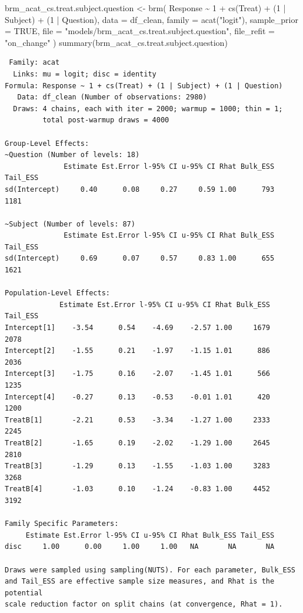 \documentclass[
  12pt,
  a4paper,
  extrafontsizes,
  onecolumn,
  openright]{memoir}
\newenvironment{Shaded}{\begin{snugshade}}{\end{snugshade}}
\newcommand{\AttributeTok}[1]{\textcolor[rgb]{0.40,0.45,0.13}{#1}}
\newcommand{\ConstantTok}[1]{\textcolor[rgb]{0.56,0.35,0.01}{#1}}
\newcommand{\DecValTok}[1]{\textcolor[rgb]{0.68,0.00,0.00}{#1}}
\newcommand{\FunctionTok}[1]{\textcolor[rgb]{0.28,0.35,0.67}{#1}}
\newcommand{\NormalTok}[1]{\textcolor[rgb]{0.00,0.23,0.31}{#1}}
\newcommand{\OtherTok}[1]{\textcolor[rgb]{0.00,0.23,0.31}{#1}}
\newcommand{\SpecialCharTok}[1]{\textcolor[rgb]{0.37,0.37,0.37}{#1}}
\newcommand{\StringTok}[1]{\textcolor[rgb]{0.13,0.47,0.30}{#1}}
\begin{document}
\begin{Shaded}
\begin{Highlighting}[]
\NormalTok{brm\_acat\_cs.treat.subject.question }\OtherTok{\textless{}{-}} \FunctionTok{brm}\NormalTok{(}
\NormalTok{    Response }\SpecialCharTok{\textasciitilde{}} \DecValTok{1} \SpecialCharTok{+} \FunctionTok{cs}\NormalTok{(Treat) }\SpecialCharTok{+}\NormalTok{ (}\DecValTok{1} \SpecialCharTok{|}\NormalTok{ Subject) }\SpecialCharTok{+}\NormalTok{ (}\DecValTok{1} \SpecialCharTok{|}\NormalTok{ Question),}
    \AttributeTok{data =}\NormalTok{ df\_clean,}
    \AttributeTok{family =} \FunctionTok{acat}\NormalTok{(}\StringTok{"logit"}\NormalTok{),}
    \AttributeTok{sample\_prior =} \ConstantTok{TRUE}\NormalTok{,}
    \AttributeTok{file =} \StringTok{"models/brm\_acat\_cs.treat.subject.question"}\NormalTok{,}
    \AttributeTok{file\_refit =} \StringTok{"on\_change"}
\NormalTok{)}
\FunctionTok{summary}\NormalTok{(brm\_acat\_cs.treat.subject.question)}
\end{Highlighting}
\end{Shaded}

\begin{verbatim}
 Family: acat 
  Links: mu = logit; disc = identity 
Formula: Response ~ 1 + cs(Treat) + (1 | Subject) + (1 | Question) 
   Data: df_clean (Number of observations: 2980) 
  Draws: 4 chains, each with iter = 2000; warmup = 1000; thin = 1;
         total post-warmup draws = 4000

Group-Level Effects: 
~Question (Number of levels: 18) 
              Estimate Est.Error l-95% CI u-95% CI Rhat Bulk_ESS Tail_ESS
sd(Intercept)     0.40      0.08     0.27     0.59 1.00      793     1181

~Subject (Number of levels: 87) 
              Estimate Est.Error l-95% CI u-95% CI Rhat Bulk_ESS Tail_ESS
sd(Intercept)     0.69      0.07     0.57     0.83 1.00      655     1621

Population-Level Effects: 
             Estimate Est.Error l-95% CI u-95% CI Rhat Bulk_ESS Tail_ESS
Intercept[1]    -3.54      0.54    -4.69    -2.57 1.00     1679     2078
Intercept[2]    -1.55      0.21    -1.97    -1.15 1.01      886     2036
Intercept[3]    -1.75      0.16    -2.07    -1.45 1.01      566     1235
Intercept[4]    -0.27      0.13    -0.53    -0.01 1.01      420     1200
TreatB[1]       -2.21      0.53    -3.34    -1.27 1.00     2333     2245
TreatB[2]       -1.65      0.19    -2.02    -1.29 1.00     2645     2810
TreatB[3]       -1.29      0.13    -1.55    -1.03 1.00     3283     3268
TreatB[4]       -1.03      0.10    -1.24    -0.83 1.00     4452     3192

Family Specific Parameters: 
     Estimate Est.Error l-95% CI u-95% CI Rhat Bulk_ESS Tail_ESS
disc     1.00      0.00     1.00     1.00   NA       NA       NA

Draws were sampled using sampling(NUTS). For each parameter, Bulk_ESS
and Tail_ESS are effective sample size measures, and Rhat is the potential
scale reduction factor on split chains (at convergence, Rhat = 1).
\end{verbatim}
\end{document}
